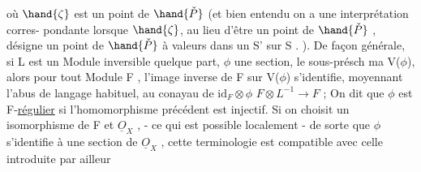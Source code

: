 o\`u $\hand{\zeta}$ est un point de $\hand{\check{P}}$ (et bien entendu on a une interpr\'etation corres-%
pondante lorsque $\hand{\zeta}$, au lieu d'\^etre un point de $\hand{\check{P}}$ , d\'esigne un point
de $\hand{\check{P}}$ \`a valeurs dans un S' sur S . ). \hand{\unsure{(}}De fa\c{c}on g\'en\'erale, si L est un
Module inversible quelque part, $\phi$ une section,  le sous-pr\'esch
ma V($\phi$), alors pour tout Module F , l'image inverse de F sur V($\phi$)
s'identifie, moyennant l'abus de langage habituel, au conayau de $\mathrm{id}_F\otimes\phi$
$F\otimes L^{-1} \longrightarrow F$ ; On dit que $\phi$ est F-\uline{r\'egulier} si l'homomorphisme pr\'ec\'edent
est injectif. Si on choisit un isomorphisme de F et $\underline{O}_X$ , - ce qui
est possible localement - de sorte que $\phi$ s'identifie \`a une section de
$\underline{O}_X$ , cette terminologie est compatible avec celle  introduite par ailleur


